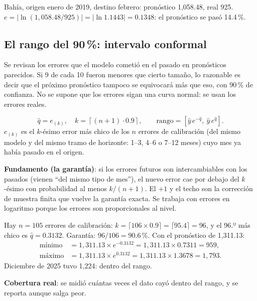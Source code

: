 \begin{amano}
Bahía, origen enero de 2019, destino febrero: pronóstico 1,058.48, real 925.
$e=|\ln(1{,}058.48/925)|=|\ln 1.1443|=0.1348$: el pronóstico se pasó 14.4\,\%.
\end{amano}

\subsection{El rango del 90\,\%: intervalo conformal}
\begin{intuicion}
Se revisan los errores que el modelo cometió en el pasado en pronósticos parecidos. Si 9 de cada 10 fueron menores que
cierto tamaño, lo razonable es decir que el próximo pronóstico tampoco se equivocará más que eso, con 90\,\% de confianza.
No se supone que los errores sigan una curva normal: se usan los errores reales.
\end{intuicion}
\[
\hat q=e_{(k)},\quad k=\left\lceil (n+1)\cdot0.9\right\rceil,\qquad \text{rango}=\left[\hat y\,e^{-\hat q},\ \hat y\,e^{\hat q}\right] .
\]
$e_{(k)}$ es el $k$-ésimo error más chico de los $n$ errores de calibración (del mismo modelo y del mismo tramo de
horizonte: 1–3, 4–6 o 7–12 meses) cuyo mes ya había pasado en el origen.

\textbf{Fundamento (la garantía)}: si los errores futuros son intercambiables con los pasados (vienen ``del mismo tipo de
mes''), el nuevo error cae por debajo del $k$-ésimo con probabilidad al menos $k/(n+1)$. El $+1$ y el techo son la
corrección de muestra finita que vuelve la garantía exacta. Se trabaja con errores en logaritmo porque los errores son
proporcionales al nivel.

\begin{amano}
Hay $n=105$ errores de calibración: $k=\lceil 106\times0.9\rceil=\lceil 95.4\rceil=96$, y el 96.º más chico es
$\hat q=0.3132$. Garantía: $96/106=90.6\,\%$. Con el pronóstico de 1,311.13:
\begin{align*}
\text{mínimo}&=1{,}311.13\times e^{-0.3132}=1{,}311.13\times0.7311=959,\\
\text{máximo}&=1{,}311.13\times e^{0.3132}=1{,}311.13\times1.3678=1{,}793 .
\end{align*}
Diciembre de 2025 tuvo 1,224: dentro del rango.
\end{amano}

\textbf{Cobertura real}: se midió cuántas veces el dato cayó dentro del rango, y se reporta aunque salga peor.

